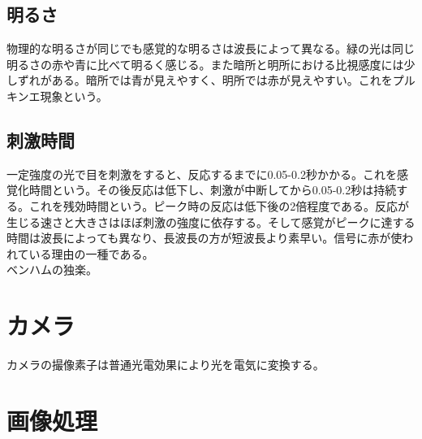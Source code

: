 		\subsection{明るさ}
			物理的な明るさが同じでも感覚的な明るさは波長によって異なる。緑の光は同じ明るさの赤や青に比べて明るく感じる。また暗所と明所における比視感度には少しずれがある。暗所では青が見えやすく、明所では赤が見えやすい。これをプルキンエ現象という。
		\subsection{刺激時間}
			一定強度の光で目を刺激をすると、反応するまでに0.05-0.2秒かかる。これを感覚化時間という。その後反応は低下し、刺激が中断してから0.05-0.2秒は持続する。これを残効時間という。ピーク時の反応は低下後の2倍程度である。反応が生じる速さと大きさはほぼ刺激の強度に依存する。そして感覚がピークに達する時間は波長によっても異なり、長波長の方が短波長より素早い。信号に赤が使われている理由の一種である。\\
			ベンハムの独楽。
	\section{カメラ}
		カメラの撮像素子は普通光電効果により光を電気に変換する。
	\section{画像処理}
